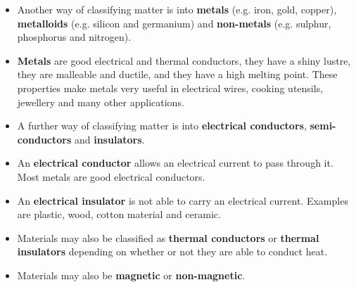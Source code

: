 \begin{itemize}[noitemsep]
\label{m38706*uid126}\item Another way of classifying matter is into \textbf{metals} (e.g. iron, gold, copper), \textbf{metalloids} (e.g. silicon and germanium) and \textbf{non-metals} (e.g. sulphur, phosphorus and nitrogen).
\label{m38706*uid127}\item \textbf{Metals} are good electrical and thermal conductors, they have a shiny lustre, they are malleable and ductile, and they have a high melting point. These properties make metals very useful in electrical wires, cooking utensils, jewellery and many other applications.
\label{m38706*uid128}\item A further way of classifying matter is into \textbf{electrical conductors}, \textbf{semi-conductors} and \textbf{insulators}.
\label{m38706*uid129}\item An \textbf{electrical conductor} allows an electrical current to pass through it. Most metals are good electrical conductors.
\label{m38706*uid130}\item An \textbf{electrical insulator} is not able to carry an electrical current. Examples are plastic, wood, cotton material and ceramic.
\label{m38706*uid131}\item Materials may also be classified as \textbf{thermal conductors} or \textbf{thermal insulators} depending on whether or not they are able to conduct heat.
\label{m38706*uid132}\item Materials may also be \textbf{magnetic} or \textbf{non-magnetic}.
\end{itemize} \pagebreak

